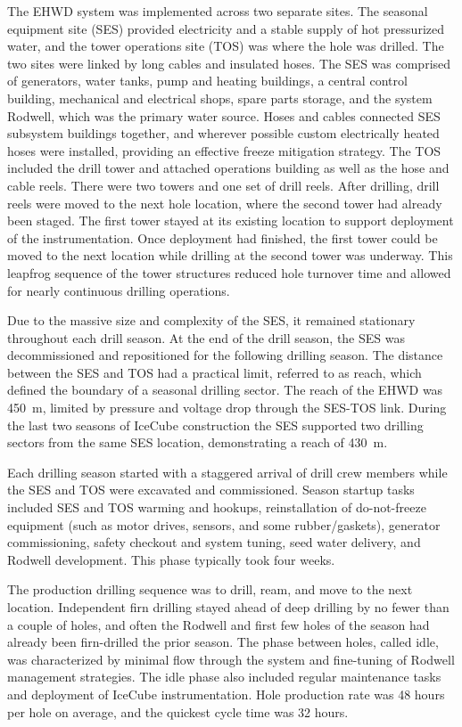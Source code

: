 The EHWD system was implemented across two separate sites.  The seasonal equipment site (SES) provided electricity and a stable supply of hot pressurized water, and the tower operations site (TOS) was where the hole was drilled.  The two sites were linked by long cables and insulated hoses. The SES was comprised of generators, water tanks, pump and heating buildings, a central control building, mechanical and electrical shops, spare parts storage, and the system Rodwell, which was the primary water source. Hoses and cables connected SES subsystem buildings together, and wherever possible custom electrically heated hoses were installed, providing an effective freeze mitigation strategy. The TOS included the drill tower and attached operations building as well as the hose and cable reels.  There were two towers and one set of drill reels.  After drilling, drill reels were moved to the next hole location, where the second tower had already been staged.  The first tower stayed at its existing location to support deployment of the instrumentation.  Once deployment had finished, the first tower could be moved to the next location while drilling at the second tower was underway.  This leapfrog sequence of the tower structures reduced hole turnover time and allowed for nearly continuous drilling operations.

Due to the massive size and complexity of the SES, it remained stationary throughout each drill season.  At the end of the drill season, the SES was decommissioned and repositioned for the following drilling season.  The distance between the SES and TOS had a practical limit, referred to as reach, which defined the boundary of a seasonal drilling sector.  The reach of the EHWD was 450~m, limited by pressure and voltage drop through the SES-TOS link.  During the last two seasons of IceCube construction the SES supported two drilling sectors from the same SES location, demonstrating a reach of 430~m.

Each drilling season started with a staggered arrival of drill crew members while the SES and TOS were excavated and commissioned.  Season startup tasks included SES and TOS warming and hookups, reinstallation of do-not-freeze equipment (such as motor drives, sensors, and some rubber/gaskets), generator commissioning, safety checkout and system tuning, seed water delivery, and Rodwell development.  This phase typically took four weeks.

The production drilling sequence was to drill, ream, and move to the next location.  Independent firn drilling stayed ahead of deep drilling by no fewer than a couple of holes, and often the Rodwell and first few holes of the season had already been firn-drilled the prior season.  The phase between holes, called idle, was characterized by minimal flow through the system and fine-tuning of Rodwell management strategies.  The idle phase also included regular maintenance tasks and deployment of IceCube instrumentation.  Hole production rate was 48 hours per hole on average, and the quickest cycle time was 32 hours.


